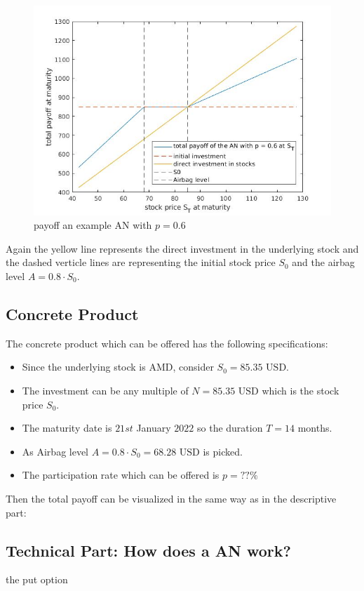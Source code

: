 \documentclass[11pt,oneside,a4paper]{article}
\begin{document}
	 \begin{figure}[H]
	 	\centering
	 	\includegraphics[width=0.8\linewidth]{payoff_AN.jpg}
	 	\caption{payoff an example AN with $ p = 0.6 $}
	 \end{figure}
	Again the yellow line represents the direct investment in the underlying stock and the dashed verticle lines are representing the initial stock price $ S_0 $ and the airbag level $ A = 0.8 \cdot S_0 $.
	\subsection{Concrete Product}
	The concrete product which can be offered has the following specifications:
	\begin{itemize}
		\item Since the underlying stock is AMD, consider $ S_0 = 85.35 \text{ USD} $.
		\item The investment can be any multiple of $ N = 85.35 \text{ USD} $ which is the stock price $ S_0 $.
		\item The maturity date is $ 21st $ January $ 2022 $ so the duration $ T = 14 $ months.
		\item As Airbag level $ A = 0.8 \cdot S_0  = 68.28 \text{ USD} $ is picked.
		\item The participation rate which can be offered is $ p = ?? \% $ %
	\end{itemize}
	Then the total payoff can be visualized in the same way as in the descriptive part:
	
	\subsection{Technical Part: How does a AN work?}
	the put option \\
	
\end{document}
